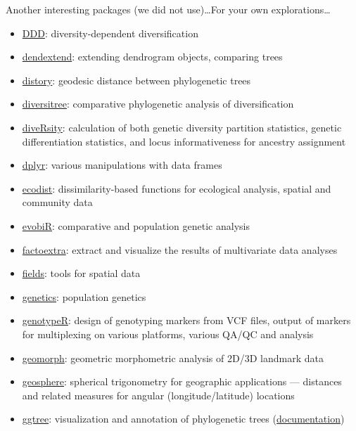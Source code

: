 \documentclass[compress, ucs, xelatex, 11pt, xcolor=svgnames, aspectratio=169,
	hyperref={
		bookmarks=true,
		unicode=true,
		colorlinks=true,
		pdftitle={Molecular data in R},
		plainpages=false,
		pdfauthor={Vojtech Zeisek},
		pdfsubject={Course about phylogeny and evolution in R},
		pdfcreator={XeLaTeX},
		pdfkeywords={R, evolution, phylogeny, molecular data},
		linkcolor=Crimson, %
		anchorcolor=Magenta, %
		citecolor=Magenta, %
		filecolor=Magenta, %
		menucolor=Magenta, %
		urlcolor=DodgerBlue, %
		pdftex},
	url={hyphens, lowtilde} %
	]{beamer}
\begin{document}
\begin{frame}[allowframebreaks]{Another interesting packages (we did not use)\ldots}{For your own explorations\ldots}
\begin{itemize}
		\item \href{https://CRAN.R-project.org/package=DDD}{DDD}: diversity-dependent diversification
		\item \href{https://CRAN.R-project.org/package=dendextend}{dendextend}: extending dendrogram objects, comparing trees
		\item \href{https://CRAN.R-project.org/package=distory}{distory}: geodesic distance between phylogenetic trees
		\item \href{https://CRAN.R-project.org/package=diversitree}{diversitree}: comparative phylogenetic analysis of diversification
		\item \href{https://CRAN.R-project.org/package=diveRsity}{diveRsity}: calculation of both genetic diversity partition statistics, genetic differentiation statistics, and locus informativeness for ancestry assignment
		\item \href{https://CRAN.R-project.org/package=dplyr}{dplyr}: various manipulations with data frames
		\item \href{https://CRAN.R-project.org/package=ecodist}{ecodist}: dissimilarity-based functions for ecological analysis, spatial and community data
		\item \href{https://CRAN.R-project.org/package=evobiR}{evobiR}: comparative and population genetic analysis
		\item \href{https://CRAN.R-project.org/package=factoextra}{factoextra}: extract and visualize the results of multivariate data analyses
		\item \href{https://CRAN.R-project.org/package=fields}{fields}: tools for spatial data
		\item \href{https://CRAN.R-project.org/package=genetics}{genetics}: population genetics
		\item \href{https://CRAN.R-project.org/package=genotypeR}{genotypeR}: design of genotyping markers from VCF files, output of markers for multiplexing on various platforms, various QA/QC and analysis
		\item \href{https://CRAN.R-project.org/package=geomorph}{geomorph}: geometric morphometric analysis of 2D/3D landmark data
		\item \href{https://CRAN.R-project.org/package=geosphere}{geosphere}: spherical trigonometry for geographic applications --- distances and related measures for angular (longitude/latitude) locations
		\item \href{https://bioconductor.org/packages/release/bioc/html/ggtree.html}{ggtree}: visualization and annotation of phylogenetic trees (\href{https://guangchuangyu.github.io/software/ggtree/documentation/}{documentation})

\end{itemize}
\end{frame}
\end{document}
